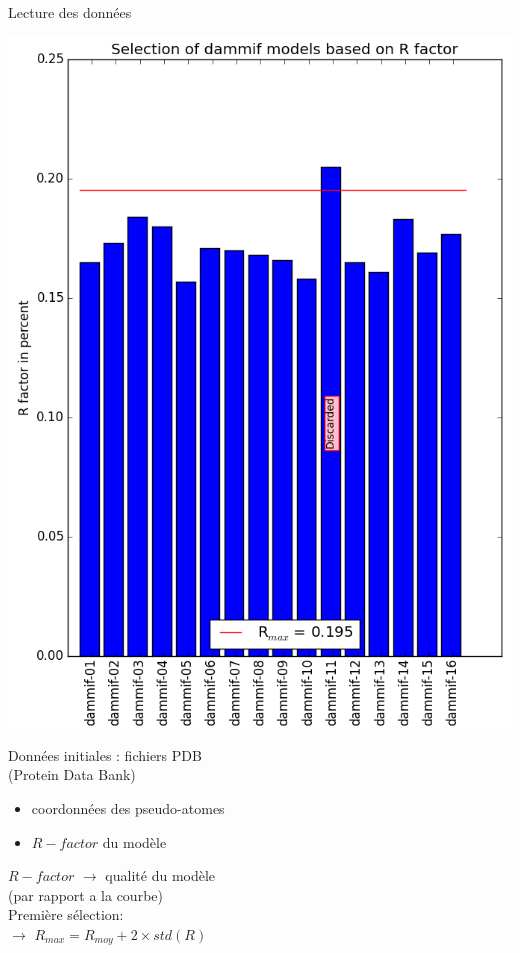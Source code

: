 \documentclass{beamer}
\begin{document}
\begin{frame}{Lecture des donn\'ees}
\begin{minipage}{0.45\linewidth}
    \begin{center}
    \includegraphics[scale=0.32]{Rfactor.png}
    \end{center}
\end{minipage} \hfill
\begin{minipage}{0.50\linewidth}
Donn\'ees initiales : fichiers PDB\\
(Protein Data Bank)
\begin{itemize}
  \item coordonn\'ees des pseudo-atomes
  \item $R-factor$ du mod\`ele
\end{itemize}

\vspace{0.2cm}

$R-factor$ $\longrightarrow$ qualit\'e du mod\`ele\\
(par rapport a la courbe)\\

Premi\`ere s\'election:\\
$\longrightarrow$ $R_{max} = R_{moy} + 2 \times std(R)$
\end{minipage}
\end{frame}
\end{document}
